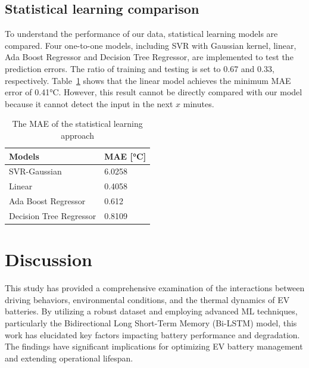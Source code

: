\subsection{Statistical learning comparison}

To understand the performance of our data, statistical learning models are compared. 
Four one-to-one models, including \gls{SVR} with Gaussian kernel, linear, Ada Boost Regressor and Decision Tree Regressor, are implemented to test the prediction errors. 
The ratio of training and testing is set to 0.67 and 0.33, respectively. 
Table~\ref{tab:stat_learning} shows that the linear model achieves the minimum MAE error of 0.41°C. 
However, this result cannot be directly compared with our model because it cannot detect the input in the next $\mathit{x}$ minutes.

\begin{table}[hbt]
    \centering
    \caption{The \gls{MAE} of the statistical learning approach}
    \label{tab:stat_learning}
    \begin{center}
    \begin{tabular}{ll}
    \toprule
        Models & \gls{MAE} [°C] \\
        \midrule
        \gls{SVR}-Gaussian & 6.0258 \\ 
        Linear & 0.4058 \\ 
        Ada Boost Regressor & 0.612 \\ 
        Decision Tree Regressor & 0.8109 \\ 
    \bottomrule
    \end{tabular}
    \end{center}
\end{table}

\section{Discussion}

This study has provided a comprehensive examination of the interactions between driving behaviors, environmental conditions, and the thermal dynamics of \gls{EV} batteries. 
By utilizing a robust dataset and employing advanced \gls{ML} techniques, particularly the Bidirectional Long Short-Term Memory (\gls{Bi-LSTM}) model, this work has elucidated key factors impacting battery performance and degradation. 
The findings have significant implications for optimizing \gls{EV} battery management and extending operational lifespan.

